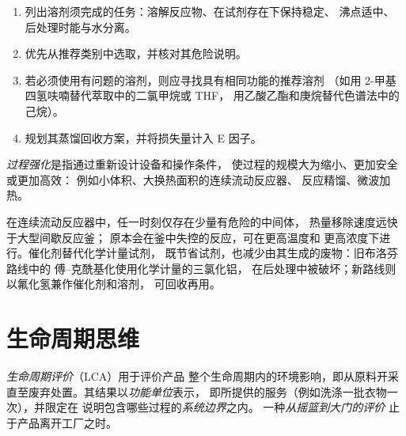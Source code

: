 \begin{method}[使用溶剂选择指南]\label{met:b3:green-industrial:solvent-choice}
\begin{enumerate}
  \item 列出溶剂须完成的任务：溶解反应物、在试剂存在下保持稳定、
        沸点适中、后处理时能与水分离。
  \item 优先从推荐类别中选取，并核对其危险说明。
  \item 若必须使用有问题的溶剂，则应寻找具有相同功能的推荐溶剂
        （如用 2-甲基四氢呋喃替代萃取中的二氯甲烷或 THF，
        用乙酸乙酯和庚烷替代色谱法中的己烷）。
  \item 规划其蒸馏回收方案，并将损失量计入 E 因子。
\end{enumerate}
\end{method}

\begin{definition}[过程强化]\label{def:b3:green-industrial:intensification}
\emph{过程强化}是指通过重新设计设备和操作条件，
使过程的规模大为缩小、更加安全或更加高效：
例如小体积、大换热面积的连续流动反应器、
反应精馏、微波加热。
\end{definition}

在连续流动反应器中，任一时刻仅存在少量有危险的中间体，
热量移除速度远快于大型间歇反应釜；
原本会在釜中失控的反应，可在更高温度和
更高浓度下进行。催化剂替代化学计量试剂，
既节省试剂，也减少由其生成的废物：旧布洛芬路线中的
傅–克酰基化使用化学计量的三氯化铝，
在后处理中被破坏；新路线则以氟化氢兼作催化剂和溶剂，
可回收再用。

\section{生命周期思维}

\begin{definition}[生命周期评价]\label{def:b3:green-industrial:lca}
\emph{生命周期评价}（LCA）用于评价产品
整个生命周期内的环境影响，即从原料开采
直至废弃处置。其结果以\emph{功能单位}表示，
即所提供的服务（例如洗涤一批衣物一次），并限定在
说明包含哪些过程的\emph{系统边界}之内。
一种\emph{从摇篮到大门的评价}
止于产品离开工厂之时。
\end{definition}

